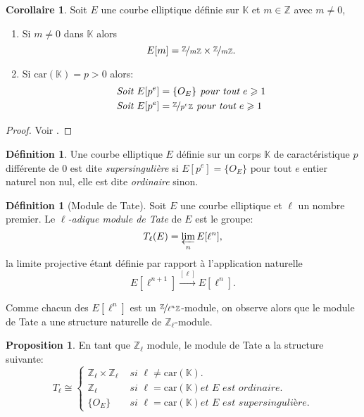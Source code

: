 \documentclass[10pt,a4paper]{book}
\theoremstyle{plain}
\theoremstyle{definition}
\theoremstyle{definition}
\newtheorem{cor}[thm]{Corollaire}
\theoremstyle{definition}
\newtheorem{prop}[thm]{Proposition}
\theoremstyle{definition}
\newtheorem{defi}[thm]{Définition}
\theoremstyle{remark}
\theoremstyle{remark}
\begin{document}
\begin{cor}
Soit $E$ une courbe elliptique définie sur $\mathbb{K}$ et $m \in \mathbb{Z}$ avec $m \neq 0$,
\begin{enumerate}
\item Si $m \neq 0$ dans  $\mathbb{K}$ alors
\begin{equation*}
E[m]=\nicefrac{\mathbb{Z}}{m\mathbb{Z}} \times \nicefrac{\mathbb{Z}}{m\mathbb{Z}}. 
\end{equation*}
\item Si $\mathrm{car}(\mathbb{K})=p>0$ alors:
\begin{equation*}
\begin{alignedat}{1}
&\textit{Soit } E[p^e]=\{O_E\} \textit{ pour tout } e \geqslant 1 \\
&\textit{Soit } E[p^e]=\nicefrac{\mathbb{Z}}{p^e\mathbb{Z}} \textit{ pour tout } e \geqslant 1
\end{alignedat}
\end{equation*}
\end{enumerate}
\end{cor}

\begin{proof}
Voir \cite[Corrolary III.6.4]{Silv1}.
\end{proof}

\begin{defi}
Une courbe elliptique $E$ définie sur un corps $\mathbb{K}$ de caractéristique $p$ différente de $0$ est dite \emph{supersingulière} si $E[p^e]=\{O_E\}$ pour tout $e$ entier naturel non nul, elle est dite \emph{ordinaire} sinon. 
\end{defi}

\begin{defi}[Module de Tate]
Soit $E$ une courbe elliptique et $\ell$ un nombre premier. Le \emph{$\ell$-adique module de Tate} de $E$ est le groupe:
\begin{equation*}
T_{\ell}(E)=\varprojlim_nE[\ell^n],
\end{equation*}
la limite projective étant définie par rapport à l'application naturelle
\begin{equation*}
E[\ell^{n+1}] \overset{[\ell]}{\rightarrow} E[\ell^n].
\end{equation*}
\end{defi}
Comme chacun des $E[\ell^n]$ est un $\nicefrac{\mathbb{Z}}{\ell^n\mathbb{Z}}$-module, on observe alors que le module de Tate a une structure naturelle de $\mathbb{Z}_{\ell}$-module.
\begin{prop}
En tant que $\mathbb{Z}_{\ell}$ module, le module de Tate a la structure suivante:
\begin{equation*}
T_{\ell} \cong 
\begin{cases} 
\mathbb{Z}_{\ell} \times \mathbb{Z}_{\ell} &\textit{ si } \ell \neq \mathrm{car}(\mathbb{K}). \\
\mathbb{Z}_{\ell} &\textit{ si } \ell=\mathrm{car}(\mathbb{K})  \textit{et E est ordinaire}. \\
\{O_E\} &\textit{ si } \ell=\mathrm{car}(\mathbb{K})  \textit{et E est supersingulière}.
\end{cases}
\end{equation*}
\end{prop}
\end{document}
